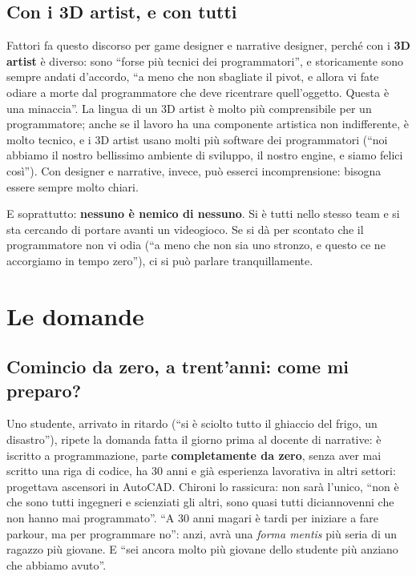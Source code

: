 \subsection{Con i 3D artist, e con tutti}

Fattori fa questo discorso per game designer e narrative designer, perché con
i \textbf{3D artist} è diverso: sono ``forse più tecnici dei programmatori'',
e storicamente sono sempre andati d'accordo, ``a meno che non sbagliate il
pivot, e allora vi fate odiare a morte dal programmatore che deve ricentrare
quell'oggetto. Questa è una minaccia''. La lingua di un 3D artist è molto più
comprensibile per un programmatore; anche se il lavoro ha una componente
artistica non indifferente, è molto tecnico, e i 3D artist usano molti più
software dei programmatori (``noi abbiamo il nostro bellissimo ambiente di
sviluppo, il nostro engine, e siamo felici così''). Con designer e narrative,
invece, può esserci incomprensione: bisogna essere sempre molto chiari.

E soprattutto: \textbf{nessuno è nemico di nessuno}. Si è tutti nello stesso
team e si sta cercando di portare avanti un videogioco. Se si dà per scontato
che il programmatore non vi odia (``a meno che non sia uno stronzo, e questo ce
ne accorgiamo in tempo zero''), ci si può parlare tranquillamente.

\section{Le domande}
\label{p5:sec:domande}

\subsection{Comincio da zero, a trent'anni: come mi preparo?}

Uno studente, arrivato in ritardo (``si è sciolto tutto il ghiaccio del
frigo, un disastro''), ripete la domanda fatta il giorno prima al docente di
narrative: è iscritto a programmazione, parte \textbf{completamente da zero},
senza aver mai scritto una riga di codice, ha 30 anni e già esperienza
lavorativa in altri settori: progettava ascensori in AutoCAD. Chironi lo
rassicura: non sarà l'unico, ``non è che sono tutti ingegneri e scienziati gli
altri, sono quasi tutti diciannovenni che non hanno mai programmato''. ``A 30
anni magari è tardi per iniziare a fare parkour, ma per programmare no'':
anzi, avrà una \emph{forma mentis} più seria di un ragazzo più giovane. E ``sei
ancora molto più giovane dello studente più anziano che abbiamo avuto''.

